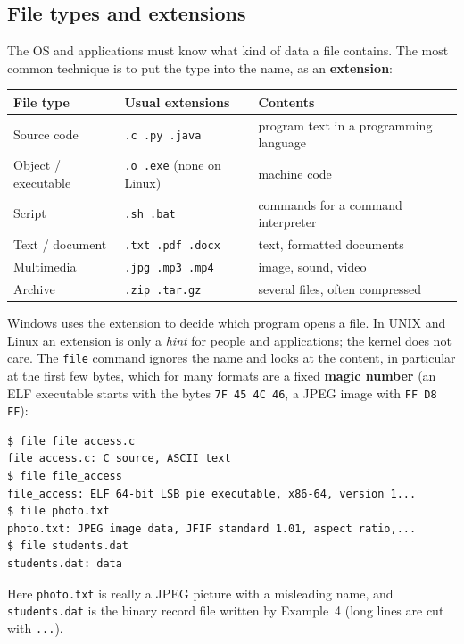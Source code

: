 \documentclass[11pt,a4paper]{article}
\newcommand{\term}[1]{\textbf{\color{mintdeep}#1}}
\newcommand{\cmd}[1]{\texttt{#1}}
\begin{document}
\subsection{File types and extensions}

The OS and applications must know what kind of data a file contains. The most common technique is to put the type into the name, as an \term{extension}:

\begin{center}
\renewcommand{\arraystretch}{1.25}
\begin{tabular}{@{}lll@{}}
\toprule
\textbf{File type} & \textbf{Usual extensions} & \textbf{Contents} \\
\midrule
Source code & \texttt{.c .py .java} & program text in a programming language \\
Object / executable & \texttt{.o .exe} (none on Linux) & machine code \\
Script & \texttt{.sh .bat} & commands for a command interpreter \\
Text / document & \texttt{.txt .pdf .docx} & text, formatted documents \\
Multimedia & \texttt{.jpg .mp3 .mp4} & image, sound, video \\
Archive & \texttt{.zip .tar.gz} & several files, often compressed \\
\bottomrule
\end{tabular}
\end{center}

Windows uses the extension to decide which program opens a file. In UNIX and Linux an extension is only a \emph{hint} for people and applications; the kernel does not care. The \cmd{file} command ignores the name and looks at the content, in particular at the first few bytes, which for many formats are a fixed \term{magic number} (an ELF executable starts with the bytes \texttt{7F 45 4C 46}, a JPEG image with \texttt{FF D8 FF}):

\begin{lstlisting}[style=term]
$ file file_access.c
file_access.c: C source, ASCII text
$ file file_access
file_access: ELF 64-bit LSB pie executable, x86-64, version 1...
$ file photo.txt
photo.txt: JPEG image data, JFIF standard 1.01, aspect ratio,...
$ file students.dat
students.dat: data
\end{lstlisting}
Here \texttt{photo.txt} is really a JPEG picture with a misleading name, and \texttt{students.dat} is the binary record file written by Example~4 (long lines are cut with \texttt{...}).
\end{document}
